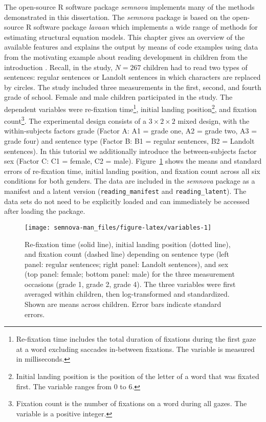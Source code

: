 \documentclass[
]{book}
\begin{document}
The open-source R \citep{R2021a} software package \emph{semnova} implements many of the methods demonstrated in this dissertation. The \emph{semnova} package is based on the open-source R software package \emph{lavaan} \citep{Rosseel2012a} which implements a wide range of methods for estimating structural equation models. This chapter gives an overview of the available features and explains the output by means of code examples using data from the motivating example about reading development in children from the introduction \citep[see][Section 1.1.1 ``Motivating Example'']{Langenberg2022z}. Recall, in the study, \(N = 267\) children had to read two types of sentences: regular sentences or Landolt sentences in which characters are replaced by circles. The study included three measurements in the first, second, and fourth grade of school. Female and male children participated in the study. The dependent variables were re-fixation time\footnote{Re-fixation time includes the total duration of fixations during the first gaze at a word excluding saccades in-between fixations. The variable is measured in milliseconds.}, initial landing position\footnote{Initial landing position is the position of the letter of a word that was fixated first. The variable ranges from 0 to 6.}, and fixation count\footnote{Fixation count is the number of fixations on a word during all gazes. The variable is a positive integer.}. The experimental design consists of a \(3 \times 2 \times 2\) mixed design, with the within-subjects factors grade (Factor A: A1 = grade one, A2 = grade two, A3 = grade four) and sentence type (Factor B: B1 = regular sentences, B2 = Landolt sentences). In this tutorial we additionally introduce the between-subjects factor sex (Factor C: C1 = female, C2 = male). Figure~\ref{fig:variables} shows the means and standard errors of re-fixation time, initial landing position, and fixation count across all six conditions for both genders. The data are included in the \emph{semnova} package as a manifest and a latent version (\texttt{reading\_manifest} and \texttt{reading\_latent}). The data sets do not need to be explicitly loaded and can immediately be accessed after loading the package.

\begin{figure}

{\centering \texttt{[image: semnova-man\_files/figure-latex/variables-1]} 

}

\caption{Re-fixation time (solid line), initial landing position (dotted line), and fixation count (dashed line) depending on sentence type (left panel: regular sentences; right panel: Landolt sentences), and sex (top panel: female; bottom panel: male) for the three measurement occasions (grade 1, grade 2, grade 4). The three variables were first averaged within children, then log-transformed and standardized. Shown are means across children. Error bars indicate standard errors.}\label{fig:variables}
\end{figure}
\end{document}
